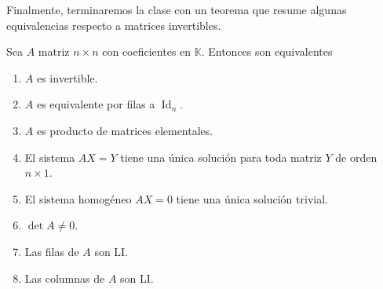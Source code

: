 \documentclass[handout]{beamer} %
\newcommand{\Id}{\operatorname{Id}}
\newcommand{\K}{\mathbb K}
\begin{document}
\begin{frame}
    Finalmente, terminaremos la clase  con un teorema que resume algunas equivalencias respecto a matrices invertibles.

\begin{teorema}
    Sea $A$ matriz $n \times n$ con coeficientes en $\K$. Entonces son equivalentes\pause
    \begin{enumerate} 
        \item $A$ es invertible.\pause
        \item $A$  es equivalente por filas a $\Id_n$.\pause
        \item $A$ es producto de matrices elementales.\pause
        \item El sistema $AX=Y$ tiene una única solución para toda matriz $Y$ de orden $n \times 1$. \pause
        \item El sistema homogéneo $AX=0$ tiene una única solución trivial.\pause
        \item $\det A \ne 0$.\pause
        \item Las filas de $A$ son LI.\pause
        \item Las columnas de $A$ son LI.
    \end{enumerate}
\end{teorema}
\end{frame}
\end{document}
